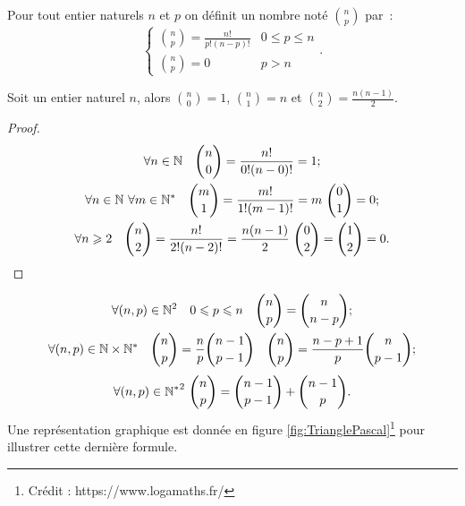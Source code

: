 \begin{defdef}
  Pour tout entier naturels \(n\) et \(p\) on définit un nombre noté \(\binom{n}{p}\) par~:
  \begin{equation}
    \begin{cases}
      \binom{n}{p}=\frac{n!}{p!(n-p)!} & 0\leqslant p \leqslant n \\
      \binom{n}{p}=0 & p > n
    \end{cases}.
  \end{equation}
\end{defdef}
\begin{prop}
  Soit un entier naturel \(n\), alors \(\binom{n}{0}=1\), \(\binom{n}{1}=n\) et \(\binom{n}{2}=\frac{n(n-1)}{2}\).
\end{prop}
\begin{proof}
  \begin{gather}
    \forall n \in \N \quad \binom{n}{0}=\frac{n!}{0!(n-0)!}=1; \\
    \forall n \in \N \ \forall m\in \N^* \quad \binom{m}{1}=\frac{m!}{1!(m-1)!}=m \ \binom{0}{1}=0;\\
    \forall n \geqslant 2 \quad \binom{n}{2}=\frac{n!}{2!(n-2)!}=\frac{n(n-1)}{2} \ \binom{0}{2}=\binom{1}{2}=0.
  \end{gather}
\end{proof}
\begin{prop}
  \begin{gather}
    \forall (n,p)\in\mathbb{N}^2 \quad 0\leqslant p \leqslant n \quad \binom{n}{p}=\binom{n}{n-p};\\
    \forall (n,p)\in\mathbb{N}\times\mathbb{N}^* \quad \binom{n}{p}=\frac{n}{p}\binom{n-1}{p-1} \quad \binom{n}{p}=\frac{n-p+1}{p}\binom{n}{p-1};
  \end{gather}
  \begin{equation}
      \label{eq:TrianglePascal}
    \forall (n,p)\in{\N^*}^2 \ \binom{n}{p}=\binom{n-1}{p-1}+\binom{n-1}{p}.
  \end{equation}
  Une représentation graphique est donnée en figure \ref{fig:TrianglePascal}\footnote{Crédit : https://www.logamaths.fr/} pour illustrer cette dernière formule.
\end{prop}
